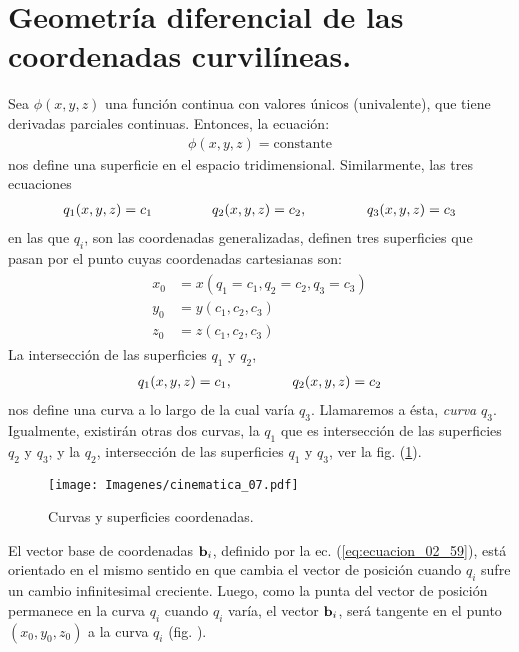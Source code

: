 \section{Geometría diferencial de las coordenadas curvilíneas.}

Sea $\phi (x, y, z)$ una función continua con valores únicos (univalente), que tiene derivadas parciales continuas. Entonces, la ecuación:
\begin{align}
    \phi (x, y, z) = \text{constante}
    \label{eq:ecuacion_02_81}
\end{align} 
nos define una superficie en el espacio tridimensional. Similarmente, las tres ecuaciones 
\begin{align}
    q_{1} (x, y, z) = c_{1} \hspace{1.5cm} q_{2} (x, y, z) = c_{2}, \hspace{1.5cm} q_{3} (x, y, z) = c_{3}
    \label{eq:ecuacion_02_82}
\end{align}
en las que $q_{i}$, son las coordenadas generalizadas, definen tres superficies que pasan por el punto cuyas coordenadas cartesianas son:
\begin{align}
\begin{aligned}
x_{0} &= x \left( q_{1} = c_{1}, q_{2} = c_{2}, q_{3} = c_{3} \right) \\[0.5em]
y_{0} &= y \left( c_{1}, c_{2}, c_{3} \right) \\[0.5em]
z_{0} &= z \left( c_{1}, c_{2}, c_{3} \right)
\end{aligned}
\label{eq:ecuacion_02_83}
\end{align}
La intersección de las superficies $q_{1}$ y $q_{2}$, 
\begin{align*}
    q_{1} (x, y, z) = c_{1}, \hspace{1.5cm} q_{2} (x, y, z) = c_{2}
\end{align*}
nos define una curva a lo largo de la cual varía $q_{3}$. Llamaremos a ésta, \emph{curva} $q_{3}$. Igualmente, existirán otras dos curvas, la $q_{1}$ que es intersección de las superficies $q_{2}$ y $q_{3}$, y la $q_{2}$, intersección de las superficies $q_{1}$ y $q_{3}$, ver la fig. (\ref{fig:figura_02_07}).
\begin{figure}[H]
    \centering
    \texttt{[image: Imagenes/cinematica\_07.pdf]}
    \caption{Curvas y superficies coordenadas.}
    \label{fig:figura_02_07}
\end{figure}
El vector base de coordenadas $\vb{b}_{i}$, definido por la ec. (\ref{eq:ecuacion_02_59}), está orientado en el mismo sentido en que cambia el vector de posición cuando $q_{i}$ sufre un cambio infinitesimal creciente. Luego, como la punta del vector de posición permanece en la curva $q_{i}$ cuando $q_{i}$ varía, el vector $\vb{b}_{i}$, será tangente en el punto $(x_{0}, y_{0}, z_{0})$ a la curva $q_{i}$ (fig. ).
